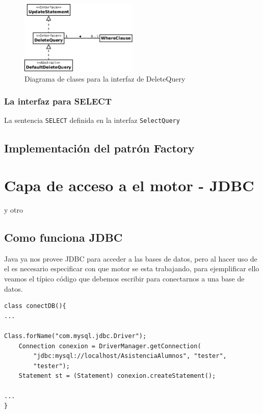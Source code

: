 \begin{figure}
  \centering
    \includegraphics[width=0.5\textwidth]{figuras/jdbgm-dc-delete.png}
  \caption{Diagrama de clases para la interfaz de DeleteQuery}
  \label{fig:dc-deletequery}
\end{figure}

\subsubsection{La interfaz para SELECT}
La sentencia \verb=SELECT= definida en la interfaz \verb=SelectQuery=

\subsection{Implementación del patrón Factory}










\section{Capa de acceso a el motor - JDBC}
y otro

\subsection{Como funciona JDBC}
Java ya nos provee JDBC para acceder a las bases de datos, pero al hacer uso de el es necesario especificar con que motor se esta trabajando, para ejemplificar ello veamos el típico código que debemos escribir para conectarnos a una base de datos.

\begin{lstlisting}[title=Porción de codigo java para la conexión a una base de datos]
class conectDB(){
...

Class.forName("com.mysql.jdbc.Driver");
	Connection conexion = DriverManager.getConnection(
		"jdbc:mysql://localhost/AsistenciaAlumnos", "tester",
		"tester");
	Statement st = (Statement) conexion.createStatement();

...
}
\end{lstlisting}

